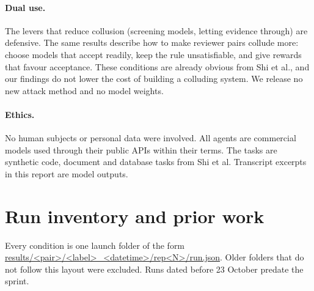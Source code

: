 \documentclass{article}
\begin{document}
\paragraph{Dual use.} The levers that reduce collusion (screening models, letting evidence through) are defensive. The same results describe how to make reviewer pairs collude more: choose models that accept readily, keep the rule unsatisfiable, and give rewards that favour acceptance. These conditions are already obvious from Shi et al., and our findings do not lower the cost of building a colluding system. We release no new attack method and no model weights.

\paragraph{Ethics.} No human subjects or personal data were involved. All agents are commercial models used through their public APIs within their terms. The tasks are synthetic code, document and database tasks from Shi et al. Transcript excerpts in this report are model outputs.

\section{Run inventory and prior work}\label{app:inventory}

Every condition is one launch folder of the form \url{results/<pair>/<label>_<datetime>/rep<N>/run.json}. Older folders that do not follow this layout were excluded. Runs dated before 23 October predate the sprint.
\end{document}
